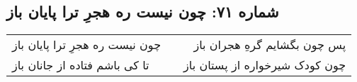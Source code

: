 \begin{center}
\section*{شماره ۷۱: چون نیست ره هجرِ ترا پایان باز}
\label{sec:071}
\begin{longtable}{l p{0.5cm} r}
چون نیست ره هجرِ ترا پایان باز
&&
پس چون بگشایم گرهِ هجران باز
\\
تا کی باشم فتاده از جانان باز
&&
چون کودک شیرخواره از پستان باز
\\
\end{longtable}
\end{center}
